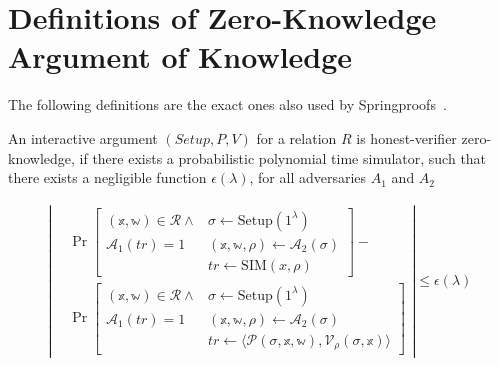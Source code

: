 
\section{Definitions of Zero-Knowledge Argument of Knowledge}\label{sec:appendix}
The following definitions are the exact ones also used by Springproofs~\cite{zhang2024springproofs}.
\begin{definition}
    An interactive argument $(Setup, P, V)$ for a relation $R$ is honest-verifier zero-knowledge, if there exists a
    probabilistic polynomial time simulator, such that there exists a negligible function $\epsilon(\lambda)$, for all adversaries $A_1$ and $A_2$

    \begin{align*}
        \left| %
        \begin{aligned} %
            & \Pr \left[ %
                \begin{array}{c|l}
                (\mathbb{x},\mathbb{w}) \in \mathcal{R} \land & \sigma \leftarrow \text{Setup}(1^\lambda) \\
                \mathcal{A}_1(tr) = 1 & (\mathbb{x},\mathbb{w},\rho) \leftarrow \mathcal{A}_2(\sigma) \\
                & tr \leftarrow \text{SIM}(x,\rho)
                \end{array}
                \right] - \\ %
            & \Pr \left[ %
                \begin{array}{c|l}
                (\mathbb{x},\mathbb{w}) \in \mathcal{R} \land & \sigma \leftarrow \text{Setup}(1^\lambda) \\
                \mathcal{A}_1(tr) = 1 & (\mathbb{x},\mathbb{w},\rho) \leftarrow \mathcal{A}_2(\sigma) \\
                & tr \leftarrow \langle \mathcal{P}(\sigma,\mathbb{x},\mathbb{w}), \mathcal{V}_\rho(\sigma,\mathbb{x}) \rangle
                \end{array}
                \right]
        \end{aligned}
        \right| %
        \leq \epsilon(\lambda)
    \end{align*}
\end{definition}

